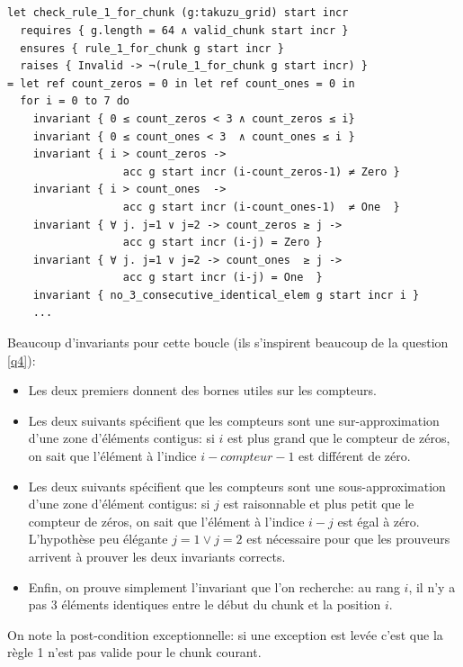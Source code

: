 ﻿\documentclass[10pt,a4paper]{article}
\begin{document}
\subsection{}
\begin{verbatim}
let check_rule_1_for_chunk (g:takuzu_grid) start incr
  requires { g.length = 64 ∧ valid_chunk start incr }
  ensures { rule_1_for_chunk g start incr }
  raises { Invalid -> ¬(rule_1_for_chunk g start incr) }
= let ref count_zeros = 0 in let ref count_ones = 0 in
  for i = 0 to 7 do
    invariant { 0 ≤ count_zeros < 3 ∧ count_zeros ≤ i}
    invariant { 0 ≤ count_ones < 3  ∧ count_ones ≤ i }
    invariant { i > count_zeros ->
                  acc g start incr (i-count_zeros-1) ≠ Zero }
    invariant { i > count_ones  ->
                  acc g start incr (i-count_ones-1)  ≠ One  }
    invariant { ∀ j. j=1 ∨ j=2 -> count_zeros ≥ j ->
                  acc g start incr (i-j) = Zero }
    invariant { ∀ j. j=1 ∨ j=2 -> count_ones  ≥ j ->
                  acc g start incr (i-j) = One  }
    invariant { no_3_consecutive_identical_elem g start incr i }
    ...
\end{verbatim}
Beaucoup d'invariants pour cette boucle (ils s'inspirent beaucoup de la question \ref{q4}):
\begin{itemize}
\item Les deux premiers donnent des bornes utiles sur les compteurs.
\item Les deux suivants spécifient que les compteurs sont une sur-approximation d'une zone d'éléments contigus: si $i$ est plus grand que le compteur de zéros, on sait que l'élément à l'indice $i - compteur-1$ est différent de zéro.
\item Les deux suivants spécifient que les compteurs sont une sous-approximation d'une zone d'élément contigus: si $j$ est raisonnable et plus petit que le compteur de zéros, on sait que l'élément à l'indice $i - j$ est égal à zéro.\\
  L'hypothèse peu élégante $j=1 \lor j=2$ est nécessaire pour que les prouveurs arrivent à prouver les deux invariants corrects.
\item Enfin, on prouve simplement l'invariant que l'on recherche: au rang $i$, il n'y a pas 3 éléments identiques entre le début du chunk et la position $i$.
\end{itemize}

On note la post-condition exceptionnelle: si une exception est levée c'est que la règle 1 n'est pas valide pour le chunk courant.
\end{document}
